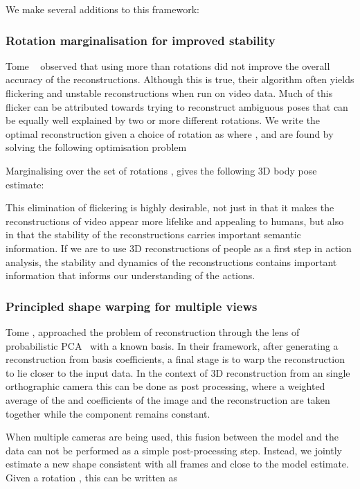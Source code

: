 \documentclass[10pt,twocolumn,letterpaper]{article}
\begin{document}
 We make several additions to this framework:
 \subsubsection{Rotation marginalisation for improved stability}
 Tome \etal ~\cite{tome2017lifting} observed that using more than  rotations did not improve the
 overall accuracy of the reconstructions. Although this is true, their algorithm
 often yields flickering and unstable reconstructions when run on video data.
 Much of this flicker can be attributed towards trying to reconstruct ambiguous
 poses that can be equally well explained by two or more different rotations.
 We write the optimal reconstruction given a choice of rotation  as \mbox{} where , and  are
 found by solving the following optimisation problem
 
 Marginalising over the set of rotations , gives the following 3D body pose estimate:
 


This elimination of flickering is highly desirable, not just in that it makes
the reconstructions of video appear more lifelike and appealing to humans, but
also in that the stability of the reconstructions carries important semantic
information. If we are to use 3D reconstructions of people as a first step in
action analysis, the stability and dynamics of the reconstructions contains
important information that informs our understanding of the actions.
\subsubsection{Principled shape warping for multiple views}
Tome \etal \cite{tome2017lifting}, approached the problem of reconstruction through the lens of
probabilistic PCA~\cite{Tipping99probabilisticprincipal} with a known basis. In
their framework, after generating a reconstruction from basis coefficients, a
final stage is to warp the reconstruction to lie closer to the input data. In
the context of 3D reconstruction from an single orthographic camera this can be
done as post processing, where a weighted average of the  and  coefficients
of the image and the reconstruction  are taken together while the
 component remains constant.

When multiple cameras are being used, this fusion between the model and the
data can not be performed as a simple post-processing step. Instead, we jointly
estimate a new shape  consistent with all frames and close to the
model estimate.
Given a rotation , this can be written as
\end{document}
